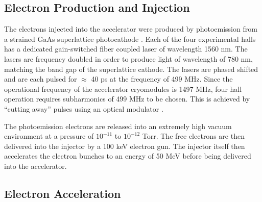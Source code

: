 \subsection{Electron Production and Injection}

%
%
The electrons injected into the accelerator were produced by photoemission from
a strained GaAs superlattice photocathode \cite{Maruyama:2004hx}.  Each of the 
four experimental halls has a dedicated gain-switched fiber coupled laser of
wavelength 1560 nm.  The lasers are frequency doubled in order to produce light
of wavelength of 780 nm, matching the band gap of the superlattice cathode. The
lasers are phased shifted and are each pulsed for $\approx$ 40 ps at the 
frequency of 499 MHz.  Since the operational frequency of the accelerator 
cryomodules is 1497 MHz, four hall operation requires subharmonics of 499 MHz to
be chosen.  This is achieved by ``cutting away'' pulses using an optical 
modulator \cite{Kazimi:2013yua}.


The photoemission electrons are released into an extremely high vacuum
environment at a pressure of $10^{-11}$ to $10^{-12}$ Torr.  The free electrons
are then delivered into the injector by a 100 keV electron gun.  The injector
itself then accelerates the electron bunches to an energy of 50 MeV 
before being delivered into the accelerator.

\subsection{Electron Acceleration}

